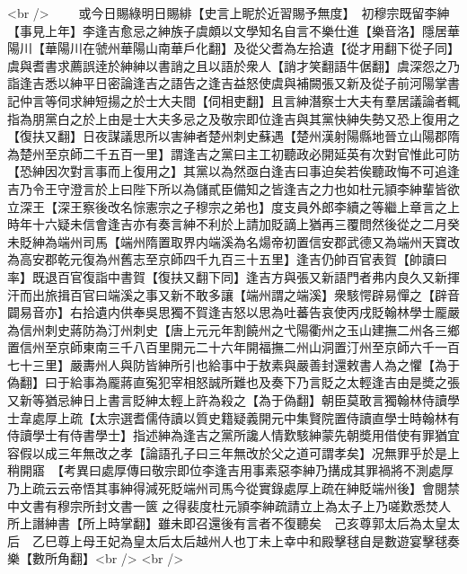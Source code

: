 <br />
　　或今日賜綠明日賜緋【史言上眤於近習賜予無度】　初穆宗既留李紳【事見上年】李逢吉愈忌之紳族子虞頗以文學知名自言不樂仕進【樂音洛】隱居華陽川【華陽川在虢州華陽山南華戶化翻】及從父耆為左拾遺【從才用翻下從子同】虞與耆書求薦誤逹於紳紳以書誚之且以語於衆人【誚才笑翻語牛倨翻】虞深怨之乃詣逢吉悉以紳平日密論逢吉之語告之逢吉益怒使虞與補闕張又新及從子前河陽掌書記仲言等伺求紳短揚之於士大夫間【伺相吏翻】且言紳潛察士大夫有羣居議論者輒指為朋黨白之於上由是士大夫多忌之及敬宗即位逢吉與其黨快紳失勢又恐上復用之【復扶又翻】日夜謀議思所以害紳者楚州刺史蘇遇【楚州漢射陽縣地晉立山陽郡隋為楚州至京師二千五百一里】謂逢吉之黨曰主工初聽政必開延英有次對官惟此可防【恐紳因次對言事而上復用之】其黨以為然亟白逢吉曰事迫矣若俟聽政悔不可追逢吉乃令王守澄言於上曰陛下所以為儲貳臣備知之皆逢吉之力也如杜元頴李紳輩皆欲立深王【深王察後改名悰憲宗之子穆宗之弟也】度支員外郎李續之等繼上章言之上時年十六疑未信會逢吉亦有奏言紳不利於上請加貶謫上猶再三覆問然後從之二月癸未貶紳為端州司馬【端州隋置取界内端溪為名煬帝初置信安郡武德又為端州天寶改為高安郡乾元復為州舊志至京師四千九百三十五里】逢吉仍帥百官表賀【帥讀曰率】既退百官復詣中書賀【復扶又翻下同】逢吉方與張又新語門者弗内良久又新揮汗而出旅揖百官曰端溪之事又新不敢多讓【端州謂之端溪】衆駭愕辟易憚之【辟音闢易音亦】右拾遺内供奉吳思獨不賀逢吉怒以思為吐蕃告哀使丙戌貶翰林學士龎嚴為信州刺史蔣防為汀州刺史【唐上元元年割饒州之弋陽衢州之玉山建撫二州各三鄉置信州至京師東南三千八百里開元二十六年開福撫二州山洞置汀州至京師六千一百七十三里】嚴夀州人與防皆紳所引也給事中于敖素與嚴善封還敕書人為之懼【為于偽翻】曰于給事為龎蔣直寃犯宰相怒誠所難也及奏下乃言貶之太輕逢吉由是奬之張又新等猶忌紳日上書言貶紳太輕上許為殺之【為于偽翻】朝臣莫敢言獨翰林侍讀學士韋處厚上疏【太宗選耆儒侍讀以質史籍疑義開元中集賢院置侍讀直學士時翰林有侍讀學士有侍書學士】指述紳為逢吉之黨所讒人情歎駭紳蒙先朝奬用借使有罪猶宜容假以成三年無改之孝【論語孔子曰三年無改於父之道可謂孝矣】况無罪乎於是上稍開寤　【考異曰處厚傳曰敬宗即位李逢吉用事素惡李紳乃搆成其罪禍將不測處厚乃上疏云云帝悟其事紳得減死貶端州司馬今從實錄處厚上疏在紳貶端州後】會閱禁中文書有穆宗所封文書一篋之得裴度杜元頴李紳疏請立上為太子上乃嗟歎悉焚人所上譖紳書【所上時掌翻】雖未即召還後有言者不復聽矣　己亥尊郭太后為太皇太后　乙巳尊上母王妃為皇太后太后越州人也丁未上幸中和殿擊毬自是數遊宴擊毬奏樂【數所角翻】<br />
<br />
